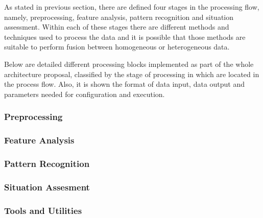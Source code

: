 As stated in previous section, there are defined four stages in the processing flow, namely, preprocessing, feature analysis, pattern recognition and situation assessment. Within each of these stages there are different methods and techniques used to process the data and it is possible that those methods are suitable to perform fusion between homogeneous or heterogeneous data.

Below are detailed different processing blocks implemented as part of the whole architecture proposal, classified by the stage of processing in which are located in the process flow. Also, it is shown the format of data input, data output and parameters needed for configuration and execution.

\subsubsection{Preprocessing}
\subsubsection{Feature Analysis}
\subsubsection{Pattern Recognition}
\subsubsection{Situation Assesment}
\subsubsection{Tools and Utilities}